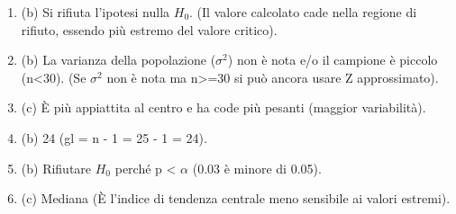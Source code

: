 \documentclass[12pt, a4paper]{article}
\begin{document}
\begin{enumerate}[leftmargin=*, label=\arabic*.]
    \item (b) Si rifiuta l'ipotesi nulla $H_0$. (Il valore calcolato cade nella regione di rifiuto, essendo più estremo del valore critico).
    \item (b) La varianza della popolazione ($\sigma^2$) non è nota e/o il campione è piccolo (n<30). (Se $\sigma^2$ non è nota ma n>=30 si può ancora usare Z approssimato).
    \item (c) È più appiattita al centro e ha code più pesanti (maggior variabilità).
    \item (b) 24 (gl = n - 1 = 25 - 1 = 24).
    \item (b) Rifiutare $H_0$ perché p < $\alpha$ (0.03 è minore di 0.05).
    \item (c) Mediana (È l'indice di tendenza centrale meno sensibile ai valori estremi).
\end{enumerate}
\end{document}
